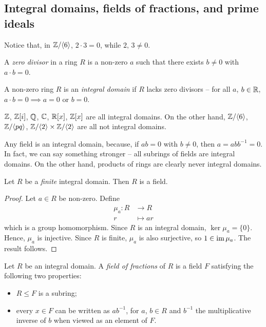 \documentclass{../../template/note}
\begin{document}
    \subsection{Integral domains, fields of fractions, and prime ideals}

    Notice that, in $\mathbb Z/\!\left \langle 6 \right \rangle$, $2\cdot 3 = 0$, while $2,\, 3 \neq 0$.
    
    \begin{definition}
        A \emph{zero divisor} in a ring $R$ is a non-zero $a$ such that there exists $b \neq 0$ with $a \cdot b = 0$.
    \end{definition}
    
    \begin{definition}
        A non-zero ring $R$ is an \emph{integral domain} if $R$ lacks zero divisors -- for all $a$, $b \in \mathbb R$, $a \cdot b = 0 \implies a = 0$ or $b=0$.
    \end{definition}
    
    \begin{example*}
        $\mathbb Z$, $\mathbb Z[i]$, $\mathbb Q$, $\mathbb C$, $\mathbb R[x]$, $\mathbb Z[x]$ are all integral domains. On the other hand, $\mathbb Z/\!\left \langle 6 \right \rangle$, $\mathbb Z/\!\left \langle pq \right \rangle$, $\mathbb Z/\!\left \langle 2 \right \rangle \times \mathbb Z/\!\left \langle 2 \right \rangle$ are all not integral domains.
    \end{example*}

    Any field is an integral domain, because, if $ab=0$ with $b\neq 0$, then $a = abb^{-1} = 0$. In fact, we can say something stronger -- all subrings of fields are integral domains. On the other hand, products of rings are clearly never integral domains.

    \begin{lemma}
        Let $R$ be a \emph{finite} integral domain. Then $R$ is a field.
    \end{lemma}
    
    \begin{proof}
        Let $a \in R$ be non-zero. Define
        \begin{align*}
            \mu_a: R &\to R \\
            r &\mapsto ar
        \end{align*}
        which is a group homomorphism. Since $R$ is an integral domain, $\ker \mu_a = \{0\}$. Hence, $\mu_a$ is injective. Since $R$ is finite, $\mu_a$ is also surjective, so $1 \in \operatorname{im} \mu_a$. The result follows.
    \end{proof}
    
    \begin{definition}
        Let $R$ be an integral domain. A \emph{field of fractions} of $R$ is a field $F$ satisfying the following two properties:
        \begin{itemize}
            \item $R \leq F$ is a subring;
            \item every $x \in F$ can be written as $ab^{-1}$, for $a$, $b \in R$ and $b^{-1}$ the multiplicative inverse of $b$ when viewed as an element of $F$.
        \end{itemize}
    \end{definition}
    
\end{document}
